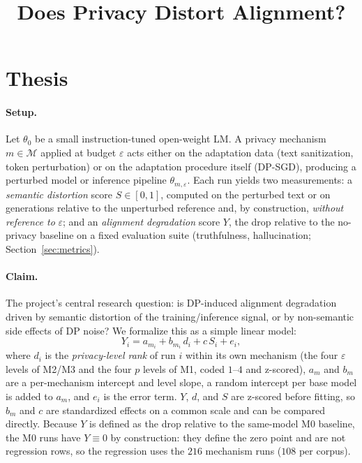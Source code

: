 \documentclass{article}
\title{Does Privacy Distort Alignment?}
\author{}
\date{}
\theoremstyle{definition}
\theoremstyle{plain}
\theoremstyle{remark}
\newcommand{\eps}{\varepsilon}
\newcommand{\Sdist}{S}
\newcommand{\seclabel}[1]{\label{sec:#1}}
\newcommand{\secref}[1]{Section~\ref{sec:#1}}
\begin{document}
\maketitle

\section{Thesis}\seclabel{thesis}
\paragraph{Setup.}
Let $\theta_0$ be a small instruction-tuned open-weight LM. A privacy
mechanism $m \in \mathcal{M}$ applied at budget $\eps$ acts either on the
adaptation data (text sanitization, token perturbation) or on the adaptation
procedure itself (DP-SGD), producing a perturbed model or
inference pipeline $\theta_{m,\eps}$. Each run yields two measurements:
a \emph{semantic distortion} score $\Sdist \in [0,1]$, computed on the
perturbed text or on generations relative to the unperturbed reference and, by
construction, \emph{without reference to} $\eps$; and an \emph{alignment
degradation} score $Y$, the drop relative to the no-privacy baseline on a fixed
evaluation suite (truthfulness, hallucination; \secref{metrics}).

\paragraph{Claim.}
The project's central research question: is DP-induced alignment degradation
driven by semantic distortion of the training/inference signal, or by
non-semantic side effects of DP noise? We formalize this as a simple linear model:
\begin{equation}\label{eq:model}
 Y_{i} = a_{m_i} + b_{m_i}\, d_i + c\, \Sdist_i + e_i,
\end{equation}
where $d_i$ is the \emph{privacy-level rank} of run $i$ within its own mechanism (the
four $\eps$ levels of M2/M3 and the four $p$ levels of M1, coded $1$--$4$ and
z-scored), $a_m$ and $b_m$ are a per-mechanism intercept and level slope, a
random intercept per base model is added to $a_m$, and $e_i$ is the error
term. $Y$, $d$, and $\Sdist$ are z-scored before fitting, so $b_m$ and $c$
are standardized effects on a common scale and can be compared directly.
Because $Y$ is defined as the drop relative to the same-model M0 baseline,
the M0 runs have $Y \equiv 0$ by construction: they define the zero point and
are not regression rows, so the regression uses the $216$ mechanism runs
($108$ per corpus).
\end{document}
